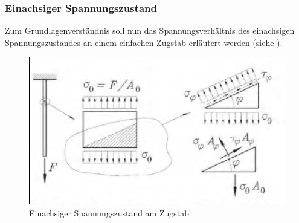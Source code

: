 \documentclass[12pt,a4paper,parskip,twoside,BCOR5mm,headsepline]{scrartcl}
\begin{document}
\begin{description*}
\subsubsection{Einachsiger Spannungszustand}
Zum Grundlagenverständnis soll nun das Spannungsverhältnis des einachsigen Spannungszustandes an einem einfachen Zugstab erläutert werden (siehe ).
\begin{figure}
\centering
\includegraphics[width=.8\textwidth]{einachsspann}
\caption[Einachsiger Spannungszustand ]{Einachsiger Spannungszustand am Zugstab \autocite[388]{dd}}
\label{fig:einachsspann} 
\end{figure}


\end{description*}
\end{document}
